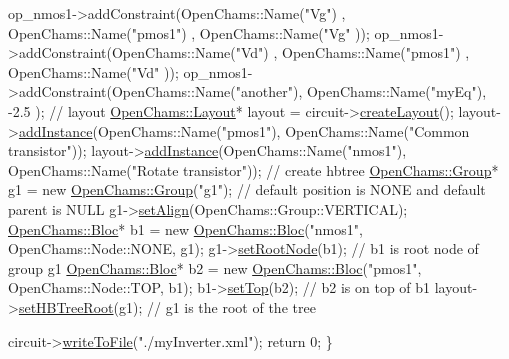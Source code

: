 \begin{DoxyCodeInclude}
    op\_nmos1->addConstraint(OpenChams::Name(\textcolor{stringliteral}{"Vg"})  , OpenChams::Name(\textcolor{stringliteral}{"pmos1"}) , OpenChams::Name(\textcolor{stringliteral}{"Vg"}  ));
    op\_nmos1->addConstraint(OpenChams::Name(\textcolor{stringliteral}{"Vd"})  , OpenChams::Name(\textcolor{stringliteral}{"pmos1"}) , OpenChams::Name(\textcolor{stringliteral}{"Vd"}  ));
    op\_nmos1->addConstraint(OpenChams::Name(\textcolor{stringliteral}{"another"}), OpenChams::Name(\textcolor{stringliteral}{"myEq"}), -2.5 );
    \textcolor{comment}{// layout}
    \hyperlink{class_open_chams_1_1_layout}{OpenChams::Layout}* layout = circuit->\hyperlink{class_open_chams_1_1_circuit_a725a691b0117c4b913b54e7bfd92832f}{createLayout}();
    layout->\hyperlink{class_open_chams_1_1_layout_a4cc1899e9b782de44700fa0e4ac477ef}{addInstance}(OpenChams::Name(\textcolor{stringliteral}{"pmos1"}), OpenChams::Name(\textcolor{stringliteral}{"Common transistor"}));
    layout->\hyperlink{class_open_chams_1_1_layout_a4cc1899e9b782de44700fa0e4ac477ef}{addInstance}(OpenChams::Name(\textcolor{stringliteral}{"nmos1"}), OpenChams::Name(\textcolor{stringliteral}{"Rotate transistor"}));
    \textcolor{comment}{// create hbtree}
    \hyperlink{class_open_chams_1_1_group}{OpenChams::Group}* g1 = \textcolor{keyword}{new} \hyperlink{class_open_chams_1_1_group}{OpenChams::Group}(\textcolor{stringliteral}{"g1"}); \textcolor{comment}{// default position
       is NONE and default parent is NULL}
    g1->\hyperlink{class_open_chams_1_1_group_a9fc27b2bc4da99c723102153c4fbf1c0}{setAlign}(OpenChams::Group::VERTICAL);
    \hyperlink{class_open_chams_1_1_bloc}{OpenChams::Bloc}* b1 = \textcolor{keyword}{new} \hyperlink{class_open_chams_1_1_bloc}{OpenChams::Bloc}(\textcolor{stringliteral}{"nmos1"}, OpenChams::Node::NONE,
       g1);
    g1->\hyperlink{class_open_chams_1_1_group_adc93b900e943312e905182fe44f21225}{setRootNode}(b1); \textcolor{comment}{// b1 is root node of group g1}
    \hyperlink{class_open_chams_1_1_bloc}{OpenChams::Bloc}* b2 = \textcolor{keyword}{new} \hyperlink{class_open_chams_1_1_bloc}{OpenChams::Bloc}(\textcolor{stringliteral}{"pmos1"}, OpenChams::Node::TOP, 
      b1);
    b1->\hyperlink{class_open_chams_1_1_node_a32e2fbbb73c6b7ee4a30189cc30106bf}{setTop}(b2); \textcolor{comment}{// b2 is on top of b1}
    layout->\hyperlink{class_open_chams_1_1_layout_a6d828958e0faf1346b27276eab101858}{setHBTreeRoot}(g1); \textcolor{comment}{// g1 is the root of the tree}

    circuit->\hyperlink{class_open_chams_1_1_circuit_a2eb07935ec946a07edcee2255b781193}{writeToFile}(\textcolor{stringliteral}{"./myInverter.xml"});
    \textcolor{keywordflow}{return} 0;
\}

\end{DoxyCodeInclude}


